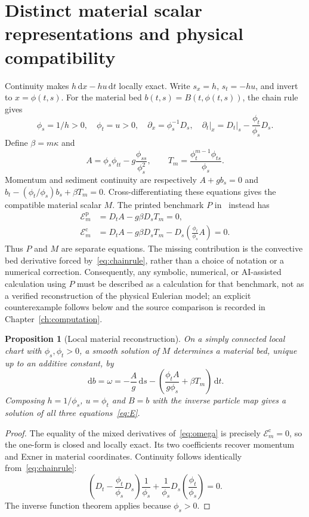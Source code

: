\documentclass[12pt,a4paper,oneside]{report}
\numberwithin{equation}{chapter}
\newtheorem{proposition}[theorem]{Proposition}
\theoremstyle{remark}\newtheorem{remark}[theorem]{Remark}
\newcommand{\dd}{\,\mathrm d}
\newcommand{\E}{\mathcal E}
\begin{document}
\section{Distinct material scalar representations and physical compatibility}
Continuity makes $h\dd x-hu\dd t$ locally exact. Write
$s_x=h$, $s_t=-hu$, and invert to $x=\phi(t,s)$. For the material bed
$b(t,s)=B(t,\phi(t,s))$, the chain rule gives
\begin{equation}\label{eq:chainrule}
 \phi_s=1/h>0,\quad \phi_t=u>0,\quad
 \partial_x=\phi_s^{-1}D_s,\quad
 \partial_t\big|_x=D_t\big|_s-\frac{\phi_t}{\phi_s}D_s.
\end{equation}
Define $\beta=m\kappa$ and
\begin{equation}
 A=\phi_s\phi_{tt}-g\frac{\phi_{ss}}{\phi_s^2},\qquad
 T_m=\frac{\phi_t^{m-1}\phi_{ts}}{\phi_s}.
\end{equation}
Momentum and sediment continuity are respectively
$A+gb_s=0$ and $b_t-(\phi_t/\phi_s)b_s+\beta T_m=0$.
Cross-differentiating these equations gives the compatible material scalar
$M$. The printed benchmark $P$ in~\cite[Eq.~(7)]{ap} instead has
\begin{align}
 \E_m^{\mathrm p}&=D_tA-g\beta D_sT_m=0,\label{eq:P}\\
 \E_m^{\mathrm c}&=D_tA-g\beta D_sT_m
       -D_s\!\left(\frac{\phi_t}{\phi_s}A\right)=0.\label{eq:M}
\end{align}
Thus $P$ and $M$ are separate equations. The missing contribution is the
convective bed derivative forced by~\eqref{eq:chainrule}, rather than a
choice of notation or a numerical correction. Consequently, any symbolic,
numerical, or AI-assisted calculation using $P$ must be described as a
calculation for that benchmark, not as a verified reconstruction of the
physical Eulerian model; an explicit counterexample follows below and the
source comparison is recorded in Chapter~\ref{ch:computation}.

\begin{proposition}[Local material reconstruction]\label{prop:material}
On a simply connected local chart with $\phi_s,\phi_t>0$, a smooth solution
of $M$ determines a material bed, unique up to an additive constant, by
\begin{equation}\label{eq:omega}
 \dd b=\omega=-\frac{A}{g}\dd s
 -\left(\frac{\phi_tA}{g\phi_s}+\beta T_m\right)\dd t.
\end{equation}
Composing $h=1/\phi_s$, $u=\phi_t$ and $B=b$ with the inverse particle map
gives a solution of all three equations~\eqref{eq:E}.
\end{proposition}
\begin{proof}
The equality of the mixed derivatives of~\eqref{eq:omega} is precisely
$\E_m^{\mathrm c}=0$, so the one-form is closed and locally exact. Its two
coefficients recover momentum and Exner in material coordinates. Continuity
follows identically from~\eqref{eq:chainrule}:
\[
 \left(D_t-\frac{\phi_t}{\phi_s}D_s\right)\frac1{\phi_s}
 +\frac1{\phi_s}D_s\left(\frac{\phi_t}{\phi_s}\right)=0.
\]
The inverse function theorem applies because $\phi_s>0$.
\end{proof}
\end{document}
